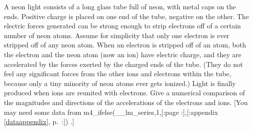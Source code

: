 A neon light consists of a long glass tube full of neon,
with metal caps on the ends.  Positive charge is placed on
one end of the tube, negative on the other.  The
electric forces generated can be strong enough to strip
electrons off of a certain number of neon atoms.  Assume for
simplicity that only one electron is ever stripped off of
any neon atom.  When an electron is stripped off of an atom,
both the electron and the neon atom (now an ion) have
electric charge, and they are accelerated by the forces
exerted by the charged ends of the tube.  (They do not feel
any significant forces from the other ions and electrons
within the tube, because only a tiny minority of neon atoms
ever gets ionized.)  Light is finally produced when ions are
reunited with electrons.  Give a numerical comparison of the magnitudes and
directions of the accelerations of the electrons and ions.
[You may need some data from
m4_ifelse(__lm_series,1,[:page \pageref{datatable}:],[:appendix \ref{dataappendix}, p.~\pageref{dataappendix}:])%
.]%
\answercheck
